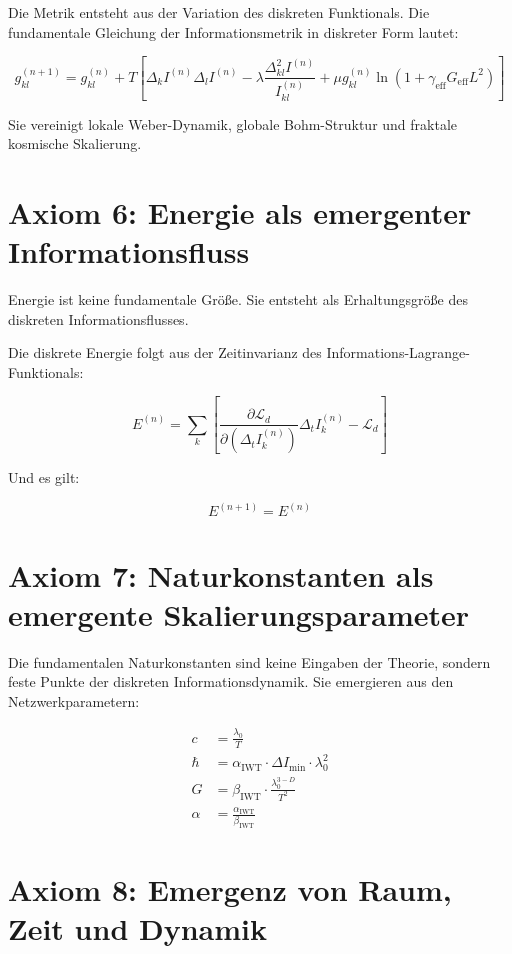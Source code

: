 Die Metrik entsteht aus der Variation des diskreten Funktionals. Die fundamentale Gleichung der Informationsmetrik in diskreter Form lautet:

\[
g_{kl}^{(n+1)} = g_{kl}^{(n)} + T \left[ \Delta_k I^{(n)} \Delta_l I^{(n)} - \lambda \frac{\Delta_{kl}^2 I^{(n)}}{I_{kl}^{(n)}} + \mu g_{kl}^{(n)} \ln(1 + \gamma_{\text{eff}} G_{\text{eff}} L^2) \right]
\]

Sie vereinigt lokale Weber-Dynamik, globale Bohm-Struktur und fraktale kosmische Skalierung.

\section{Axiom 6: Energie als emergenter Informationsfluss}

Energie ist keine fundamentale Größe. Sie entsteht als Erhaltungsgröße des diskreten Informationsflusses.

Die diskrete Energie folgt aus der Zeitinvarianz des Informations-Lagrange-Funktionals:

\[
E^{(n)} = \sum_k \left[ \frac{\partial \mathcal{L}_d}{\partial (\Delta_t I_k^{(n)})} \Delta_t I_k^{(n)} - \mathcal{L}_d \right]
\]

Und es gilt:

\[
E^{(n+1)} = E^{(n)}
\]

\section{Axiom 7: Naturkonstanten als emergente Skalierungsparameter}

Die fundamentalen Naturkonstanten sind keine Eingaben der Theorie, sondern feste Punkte der diskreten Informationsdynamik. Sie emergieren aus den Netzwerkparametern:

\begin{align*}
c &= \frac{\lambda_0}{T} \\
\hbar &= \alpha_{\text{IWT}} \cdot \Delta I_{\text{min}} \cdot \lambda_0^2 \\
G &= \beta_{\text{IWT}} \cdot \frac{\lambda_0^{3-D}}{T^2} \\
\alpha &= \frac{\alpha_{\text{IWT}}}{\beta_{\text{IWT}}}
\end{align*}

\section{Axiom 8: Emergenz von Raum, Zeit und Dynamik}

